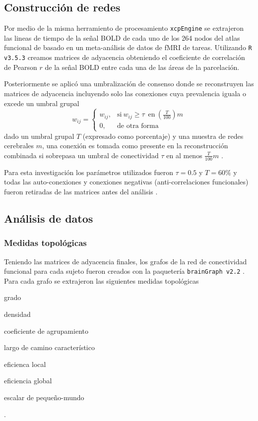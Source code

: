 \subsection{Construcción de redes}
Por medio de la misma herramiento de procesamiento \texttt{xcpEngine} se extrajeron las lineas de tiempo de la señal BOLD de cada uno de los 264 nodos del atlas funcional de \parencite{Power2011} basado en un meta-análisis de datos de fMRI de tareas. Utilizando \texttt{R v3.5.3} \parencite{R2019} \parencite{Rstudio2018} creamos matrices de  adyacencia obteniendo el coeficiente de correlación de Pearson $r$ de la señal BOLD entre cada una de las áreas de la parcelación.\par
Posteriormente se aplicó una umbralización de consenso donde se reconstruyen las matrices de adyacencia incluyendo solo las conexiones cuya prevalencia iguala o excede un umbral grupal \parencite{DeReus2013}
\begin{equation}
    \label{eqn:threshold}
    w_{ij}=
    \begin{cases}
        w_{ij}, & \text{si}\ w_{ij} \geq \tau \enspace \text{en}\ (\frac{T}{100})m \\
        0, & \text{de otra forma}
    \end{cases}
\end{equation}
dado un umbral grupal $T$ (expresado como porcentaje) y una muestra de redes cerebrales $m$, una conexión es tomada como presente en la reconstrucción combinada si sobrepasa un umbral de conectividad $\tau$ en al menos $\frac{T}{100}m$ . \par
Para esta investigación los parámetros utilizados fueron $\tau = 0.5$ y $T = 60\%$ y todas las auto-conexiones y conexiones negativas (anti-correlaciones funcionales) fueron retiradas de las matrices antes del análisis \parencite{Rubinov2010}.

\subsection{Análisis de datos}
\subsubsection{Medidas topológicas}
Teniendo las matrices de adyacencia finales, los grafos de la red de conectividad funcional para cada sujeto fueron creados con la paquetería \texttt{brainGraph v2.2} \parencite{Watson2018}. Para cada grafo se extrajeron las siguientes medidas topológicas
\begin{enumerate*}[label=\emph{\alph*}), before=\unskip{: }, itemjoin={{; }}, itemjoin*={{, y }}]
    \item grado
    \item densidad
    \item coeficiente de agrupamiento
    \item largo de camino característico
    \item eficienca local
    \item eficiencia global
    \item escalar de pequeño-mundo
\end{enumerate*}.

